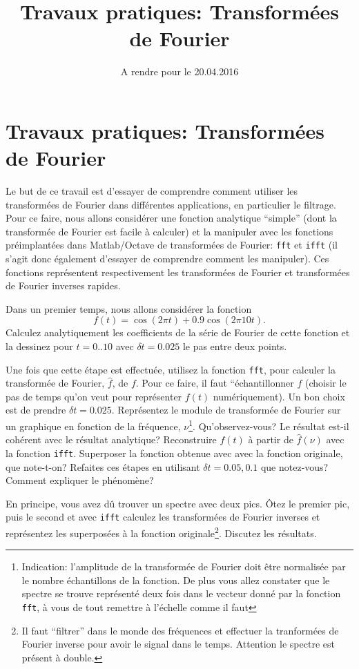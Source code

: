 \documentclass[a4paper,10pt]{article}
\title{Travaux pratiques: Transformées de Fourier}
\date{A rendre pour le 20.04.2016}
\newcommand{\hf}{\hat{f}}
\begin{document}
\maketitle

\section*{Travaux pratiques: Transformées de Fourier}

Le but de ce travail est d'essayer de comprendre comment utiliser les transformées de Fourier dans différentes applications,
en particulier le filtrage. Pour ce faire, nous allons considérer une fonction analytique ``simple'' (dont
la transformée de Fourier est facile à calculer) et la manipuler avec les fonctions préimplantées dans Matlab/Octave de
transformées de Fourier: \texttt{fft} et \texttt{ifft} (il s'agit donc également d'essayer de comprendre comment les manipuler). 
Ces fonctions représentent respectivement les transformées de Fourier et transformées de Fourier inverses rapides.

Dans un premier temps, nous allons considérer la fonction
\begin{equation}
 f(t)=\cos(2\pi t)+0.9\cos(2\pi 10 t).
\end{equation}
Calculez analytiquement les coefficients de la série de Fourier de cette fonction
et la dessinez pour $t=0..10$ avec $\delta t=0.025$ le pas entre deux points.

Une fois que cette étape est effectuée, utilisez la fonction \texttt{fft}, pour 
calculer la transformée de Fourier, $\hf$, de $f$. Pour ce faire,
il faut ``\'echantillonner $f$ (choisir le pas de temps qu'on veut pour représenter 
$f(t)$ numériquement). Un bon choix est de prendre $\delta t=0.025$.
Représentez le module de transformée de Fourier sur un graphique en fonction de la fréquence, $\nu$\footnote{Indication: l'amplitude de la transformée de Fourier doit être normalisée par le 
nombre échantillons de la fonction. De plus vous allez constater que le spectre se trouve représenté deux fois dans le vecteur donné par la fonction \texttt{fft}, à vous de tout remettre à l'échelle comme il faut}.
Qu'observez-vous? Le résultat est-il cohérent avec le résultat analytique? 
Reconstruire $f(t)$ à partir de $\hf(\nu)$ avec la fonction \texttt{ifft}. Superposer la fonction obtenue avec avec la fonction originale, que note-t-on?
Refaites ces étapes en utilisant $\delta t=0.05,0.1$ que notez-vous? Comment expliquer le phénomène?

En principe, vous avez dû trouver un spectre avec deux pics. Ôtez le premier 
pic, puis le second et avec \texttt{ifft} 
calculez les transformées de Fourier inverses et représentez les superposées à la fonction originale\footnote{Il faut ``filtrer'' dans le monde des fréquences et effectuer la tranformées de Fourier inverse pour avoir 
le signal dans le temps. Attention le spectre est présent à double.}. Discutez les résultats.
\end{document}
